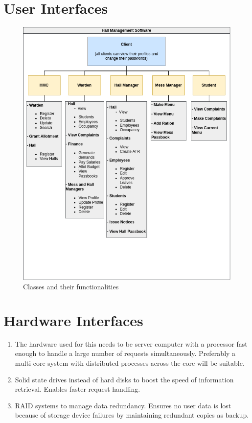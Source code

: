 \documentclass{scrreprt}
\begin{document}
\section{User Interfaces}
\begin{figure}
    \centering
    \includegraphics[width=1.0\linewidth]{Class_Functionalities.png}
    \caption{Classes and their functionalities}
    \label{fig:enter-label}
\end{figure}

\section{Hardware Interfaces}
\begin{enumerate}
    \item The hardware used for this needs to be server computer with a processor fast enough to handle a large number of requests simultaneously. Preferably a multi-core system with distributed processes across the core will be suitable.
    \item Solid state drives instead of hard disks to boost the speed of information retrieval. Enables faster request handling.
    \item RAID systems to manage data redundancy. Ensures no user data is lost because of storage device failures by maintaining redundant copies as backup.
\end{enumerate}
\end{document}
